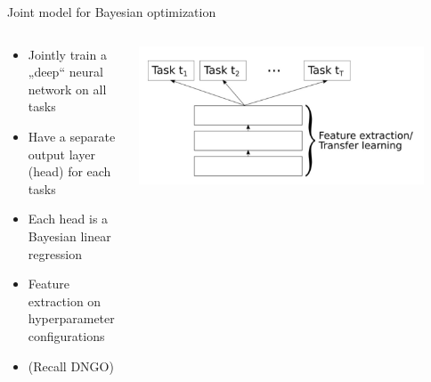 \begin{frame}[c]{Joint model for Bayesian optimization}

\begin{columns}[T] %
\begin{column}{.38\textwidth}

\begin{itemize}
    \item<1-> Jointly train a „deep“ neural network on all tasks 
    \item<2-> Have a separate output layer (head) for each tasks 
    \item<3-> Each head is a Bayesian linear regression 
    \item<4-> Feature extraction on hyperparameter configurations 
    \item<5-> (Recall DNGO)
\end{itemize}
\end{column}%

\hfill%

\begin{column}{.58\textwidth}
\includegraphics[width=0.9\textwidth]{w07_hpo_grey_box/images/meta_learning/perrone_int.jpg}
\end{column}%
\end{columns}

\hspace{12cm}

\end{frame}
%
%

